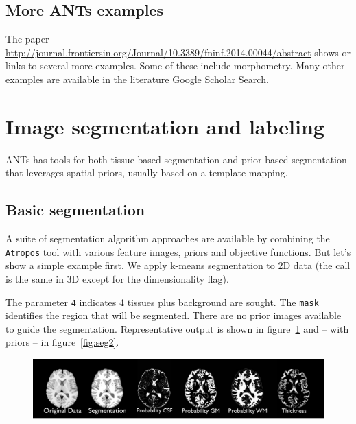 \documentclass{InsightArticle}
\begin{document}
\subsection{More ANTs examples}
The paper
\href{http://journal.frontiersin.org/Journal/10.3389/fninf.2014.00044/abstract}{http://journal.frontiersin.org/Journal/10.3389/fninf.2014.00044/abstract}
shows or links to several more examples.  Some of these include
morphometry.  
Many other examples are available in the literature \href{http://scholar.google.com/citations?user=ox-mhOkAAAAJ&hl=en}{Google
  Scholar Search}.


\newpage
\section{Image segmentation and labeling}
ANTs has tools for both tissue based segmentation and prior-based segmentation that 
leverages spatial priors, usually based on a template mapping.  
\subsection{Basic segmentation}
A suite of segmentation algorithm approaches are available by
combining the \texttt{Atropos} tool with various feature images,
priors and objective functions.  But let's show a simple example
first. We apply k-means segmentation to 2D data (the call is the same
in 3D except for the dimensionality flag). 

The parameter \texttt{4} indicates 4 tissues plus background are
sought.  The \texttt{mask} identifies the region that will be segmented. 
There are no prior images available to guide the segmentation.
Representative output is shown 
in figure~\ref{fig:seg} and -- with priors -- in figure~\ref{fig:seg2}.
\begin{figure}
\includegraphics[width=1\textwidth]{Figures/segmentation.pdf} 
\label{fig:seg}
\end{figure}
\end{document}
